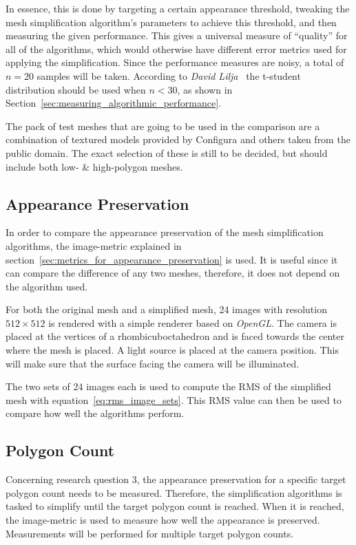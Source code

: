 In essence, this is done by targeting a certain appearance threshold, tweaking the mesh simplification algorithm's parameters to achieve this threshold, and then measuring the given performance. This gives a universal measure of ``quality'' for all of the algorithms, which would otherwise have different error metrics used for applying the simplification. Since the performance measures are noisy, a total of \(n=20\) samples will be taken. According to \emph{David Lilja}~\cite[p.~50]{lilja2005measuring} the t-student distribution should be used when \(n < 30\), as shown in Section~\ref{sec:measuring_algorithmic_performance}.

The pack of test meshes that are going to be used in the comparison are a combination of textured models provided by Configura and others taken from the public domain. The exact selection of these is still to be decided, but should include both low- \& high-polygon meshes.
\fi

\iffalse
\subsection{Appearance Preservation} \label{sec:appearance_preservation}
In order to compare the appearance preservation of the mesh simplification algorithms, the image-metric explained in section~\ref{sec:metrics_for_appearance_preservation} is used. It is useful since it can compare the difference of any two meshes, therefore, it does not depend on the algorithm used.

For both the original mesh and a simplified mesh, 24 images with resolution $512 \times 512$ is rendered with a simple renderer based on \emph{OpenGL}. The camera is placed at the vertices of a rhombicuboctahedron and is faced towards the center where the mesh is placed. A light source is placed at the camera position. This will make sure that the surface facing the camera will be illuminated.

The two sets of 24 images each is used to compute the RMS of the simplified mesh with equation~\ref{eq:rms_image_sets}. This RMS value can then be used to compare how well the algorithms perform. 
\subsection{Polygon Count} \label{sec:polygon_count}
Concerning research question 3, the appearance preservation for a specific target polygon count needs to be measured. Therefore, the simplification algorithms is tasked to simplify until the target polygon count is reached. When it is reached, the image-metric is used to measure how well the appearance is preserved. Measurements will be performed for multiple target polygon counts. 

